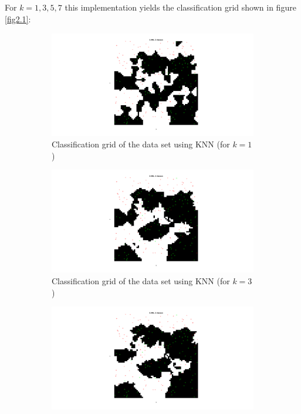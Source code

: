 \documentclass[10pt]{article}
\begin{document}
\subsection{}
For $k={1, 3, 5, 7}$ this implementation yields the classification grid shown in figure \ref{fig2.1}:
\begin{figure}[H]
  \centering
  \begin{subfigure}{.48\textwidth}
    \includegraphics[width=1\linewidth]{assign2_2_1.png}
    \caption{Classification grid of the data set using KNN (for $k=1$)}
    \label{fig2.1a}
  \end{subfigure}
  \begin{subfigure}{.48\textwidth}
    \includegraphics[width=1\linewidth]{assign2_2_3.png}
    \caption{Classification grid of the data set using KNN (for $k=3$)}
    \label{fig2.1b}
  \end{subfigure}
  \begin{subfigure}{.48\textwidth}
    \includegraphics[width=1\textwidth]{assign2_2_5.png}

\end{subfigure}
\end{figure}
\end{document}
